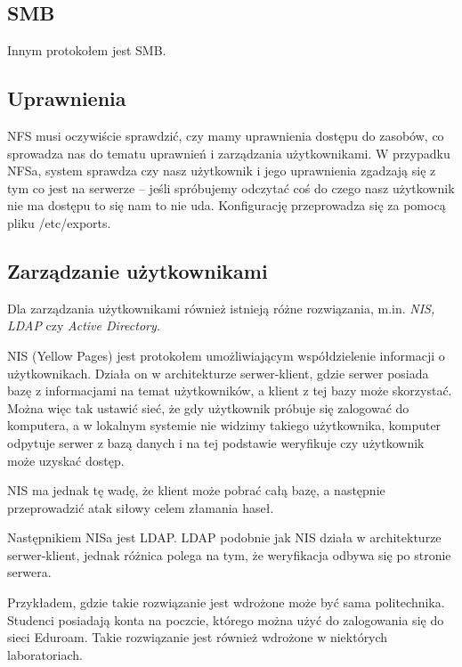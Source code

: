 \subsection{SMB}
Innym protokołem jest SMB.

\subsection{Uprawnienia}
NFS musi oczywiście sprawdzić, czy mamy uprawnienia dostępu do zasobów, co sprowadza nas do tematu uprawnień i zarządzania użytkownikami.
W przypadku NFSa, system sprawdza czy nasz użytkownik i jego uprawnienia zgadzają się z tym co jest na serwerze -- jeśli spróbujemy odczytać coś do czego nasz użytkownik nie ma dostępu to się nam to nie uda.
Konfigurację przeprowadza się za pomocą pliku /etc/exports.

\subsection{Zarządzanie użytkownikami}
Dla zarządzania użytkownikami również istnieją różne rozwiązania, m.in. \textit{NIS, LDAP} czy \textit{Active Directory.}

NIS (Yellow Pages) jest protokołem umożliwiającym współdzielenie informacji o użytkownikach.
Działa on w architekturze serwer-klient, gdzie serwer posiada bazę z informacjami na temat użytkowników, a klient z tej bazy może skorzystać.
Można więc tak ustawić sieć, że gdy użytkownik próbuje się zalogować do komputera, a w lokalnym systemie nie widzimy takiego użytkownika, komputer odpytuje serwer z bazą danych i na tej podstawie weryfikuje czy użytkownik może uzyskać dostęp.

NIS ma jednak tę wadę, że klient może pobrać całą bazę, a następnie przeprowadzić atak siłowy celem złamania haseł.

Następnikiem NISa jest LDAP.
LDAP podobnie jak NIS działa w architekturze serwer-klient, jednak różnica polega na tym, że weryfikacja odbywa się po stronie serwera.

Przykładem, gdzie takie rozwiązanie jest wdrożone może być sama politechnika.
Studenci posiadają konta na poczcie, którego można użyć do zalogowania się do sieci Eduroam.
Takie rozwiązanie jest również wdrożone w niektórych laboratoriach.